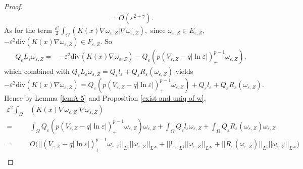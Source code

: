 \documentclass[12pt,reqno]{amsart}
\numberwithin{equation}{section}
\theoremstyle{definition}
\theoremstyle{remark}
\begin{document}
\begin{proof}
\begin{equation*}
\begin{split}
=O\left(  \varepsilon^{2+\gamma}\right).
\end{split}
\end{equation*}
As for the term $ \frac{\varepsilon^2}{2}\int_{\Omega}\left( K(x)\nabla \omega_{\varepsilon,Z}|\nabla \omega_{\varepsilon,Z}\right), $ since  $ \omega_{\varepsilon,Z}\in E_{\varepsilon,Z} $,  $ -\varepsilon^2\text{div}(K(x)\nabla \omega_{\varepsilon,Z})\in F_{\varepsilon,Z} $. So
\begin{equation*}
\begin{split}
Q_\varepsilon L_\varepsilon \omega_{\varepsilon,Z}%
=&-\varepsilon^2\text{div}(K(x)\nabla \omega_{\varepsilon,Z})-Q_\varepsilon\left (p\left (V_{\varepsilon,Z}-q|\ln\varepsilon|\right )^{p-1}_+\omega_{\varepsilon,Z}\right ),
\end{split}
\end{equation*}
which combined with $ Q_\varepsilon L_\varepsilon \omega_{\varepsilon,Z}=Q_\varepsilon l_\varepsilon+Q_\varepsilon R_\varepsilon(\omega_{\varepsilon,Z})  $ yields
\begin{equation*}
-\varepsilon^2\text{div}(K(x)\nabla \omega_{\varepsilon,Z})=Q_\varepsilon\left (p\left (V_{\varepsilon,Z}-q|\ln\varepsilon|\right )^{p-1}_+\omega_{\varepsilon,Z}\right )+Q_\varepsilon l_\varepsilon+Q_\varepsilon R_\varepsilon(\omega_{\varepsilon,Z}).
\end{equation*}
Hence by Lemma \ref{lemA-5} and Proposition \ref{exist and uniq of w}, 
\begin{equation*}
\begin{split}
\varepsilon^2\int_{\Omega}&\left( K(x)\nabla \omega_{\varepsilon,Z}|\nabla \omega_{\varepsilon,Z}\right)\\
=&\int_{\Omega}Q_\varepsilon\left (p\left (V_{\varepsilon,Z}-q|\ln\varepsilon|\right )^{p-1}_+ \omega_{\varepsilon,Z}\right )\omega_{\varepsilon,Z}+\int_{\Omega}Q_\varepsilon l_\varepsilon\omega_{\varepsilon,Z}+\int_{\Omega}Q_\varepsilon R_\varepsilon(\omega_{\varepsilon,Z})\omega_{\varepsilon,Z}\\
=&O\bigg(|| \left (V_{\varepsilon,Z}-q|\ln\varepsilon|\right )^{p-1}_+\omega_{\varepsilon,Z}||_{L^1}||\omega_{\varepsilon,Z}||_{L^\infty}+|| l_\varepsilon||_{L^1}||\omega_{\varepsilon,Z}||_{L^\infty}+|| R_\varepsilon(\omega_{\varepsilon,Z})||_{L^1} ||\omega_{\varepsilon,Z}||_{L^\infty}\bigg )\\

\end{split}
\end{equation*}
\end{proof}
\end{document}
